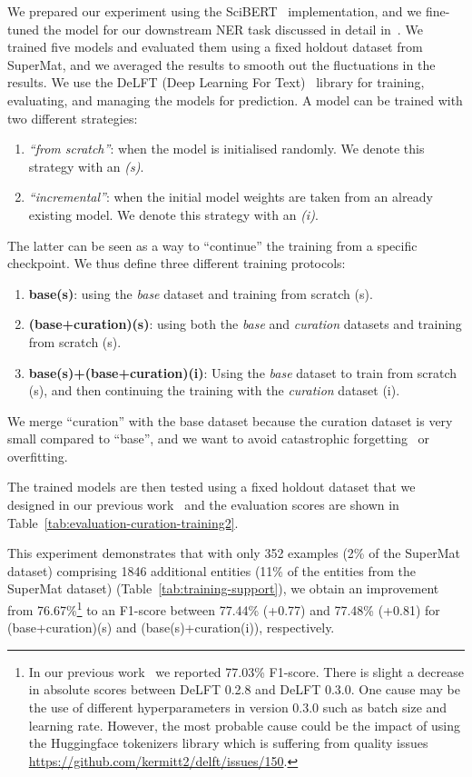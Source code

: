 \documentclass[]{interact}
\theoremstyle{plain} %
\theoremstyle{definition}
\theoremstyle{remark}
\begin{document}
We prepared our experiment using the SciBERT~\cite{Beltagy2019SciBERT} implementation, and we fine-tuned the model for our downstream NER task discussed in detail in~\cite{lfoppiano2023automatic}.
We trained five models and evaluated them using a fixed holdout dataset from SuperMat, and we averaged the results to smooth out the fluctuations in the results. 
We use the DeLFT (Deep Learning For Text)~\cite{DeLFT} library for training, evaluating, and managing the models for prediction.  
A model can be trained with two different strategies: 
\begin{enumerate}
    \item \emph{``from scratch''}: when the model is initialised randomly. We denote this strategy with an \emph{(s)}.
    \item \emph{``incremental''}: when the initial model weights are taken from an already existing model. We denote this strategy with an \emph{(i)}.
\end{enumerate}
The latter can be seen as a way to ``continue'' the training from a specific checkpoint.
We thus define three different training protocols: 
\begin{enumerate}
    \item \textbf{base(s)}: using the \emph{base} dataset and training from scratch (s).
    \item \textbf{(base+curation)(s)}: using both the \emph{base} and \emph{curation} datasets and training from scratch (s).
    \item \textbf{base(s)+(base+curation)(i)}: Using the \emph{base} dataset to train from scratch (s), and then continuing the training with the \emph{curation} dataset (i).
\end{enumerate}
We merge ``curation'' with the base dataset because the curation dataset is very small compared to ``base'', and we want to avoid catastrophic forgetting~\cite{overcoming-kirkpatrick-etal-2016} or overfitting.

The trained models are then tested using a fixed holdout dataset that we designed in our previous work~\cite{lfoppiano2023automatic} and the evaluation scores are shown in Table~\ref{tab:evaluation-curation-training2}.


This experiment demonstrates that with only 352 examples (2\% of the SuperMat dataset) comprising 1846 additional entities (11\% of the entities from the SuperMat dataset) (Table~\ref{tab:training-support}), we obtain an improvement from 76.67\%\footnote{In our previous work~\cite{lfoppiano2023automatic} we reported 77.03\% F1-score. 
There is slight a decrease in absolute scores between DeLFT 0.2.8 and DeLFT 0.3.0. 
One cause may be the use of different hyperparameters in version 0.3.0 such as batch size and learning rate.
However, the most probable cause could be the impact of using the Huggingface tokenizers library which is suffering from quality issues \url{https://github.com/kermitt2/delft/issues/150}.} to an F1-score between 77.44\% (+0.77) and 77.48\% (+0.81) for (base+curation)(s) and (base(s)+curation(i)), respectively. 
\end{document}
